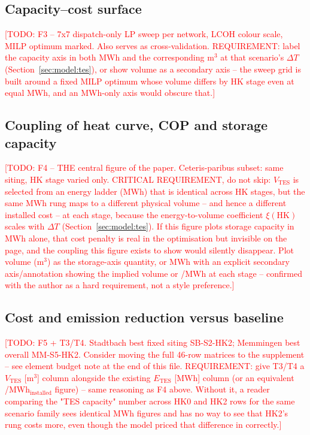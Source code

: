 \documentclass[review,3p]{elsarticle}
\newcommand{\todo}[1]{\textcolor{red}{[TODO: #1]}}
\begin{document}
\subsection{Capacity--cost surface}
\label{sec:results:sweep}
\todo{F3 -- 7x7 dispatch-only LP sweep per network, LCOH colour scale,
MILP optimum marked. Also serves as cross-validation.
REQUIREMENT: label the capacity axis in both MWh and the corresponding
m$^3$ at that scenario's $\Delta T$ (Section~\ref{sec:model:tes}), or
show volume as a secondary axis -- the sweep grid is built around a
fixed MILP optimum whose volume differs by HK stage even at equal MWh,
and an MWh-only axis would obscure that.}

\subsection{Coupling of heat curve, COP and storage capacity}
\label{sec:results:coupling}
\todo{F4 -- THE central figure of the paper. Ceteris-paribus subset:
same siting, HK stage varied only.
CRITICAL REQUIREMENT, do not skip: $V_\mathrm{TES}$ is selected from an
energy ladder (MWh) that is identical across HK stages, but the same
MWh rung maps to a different physical volume -- and hence a different
installed cost -- at each stage, because the energy-to-volume
coefficient $\xi(\mathrm{HK})$ scales with $\Delta T$
(Section~\ref{sec:model:tes}). If this figure plots storage capacity in
MWh alone, that cost penalty is real in the optimisation but invisible
on the page, and the coupling this figure exists to show would silently
disappear. Plot volume (m$^3$) as the storage-axis quantity, or MWh with
an explicit secondary axis/annotation showing the implied volume or
\si{\eur}/MWh at each stage -- confirmed with the author as a hard
requirement, not a style preference.}

\subsection{Cost and emission reduction versus baseline}
\label{sec:results:costs}
\todo{F5 + T3/T4. Stadtbach best fixed siting SB-S2-HK2; Memmingen best
overall MM-S5-HK2. Consider moving the full 46-row matrices to the
supplement -- see element budget note at the end of this file.
REQUIREMENT: give T3/T4 a $V_\mathrm{TES}$ [m$^3$] column alongside the
existing $E_\mathrm{TES}$ [MWh] column (or an equivalent
\si{\eur}/MWh$_\mathrm{installed}$ figure) -- same reasoning as F4 above.
Without it, a reader comparing the "TES capacity" number across HK0 and
HK2 rows for the same scenario family sees identical MWh figures and
has no way to see that HK2's rung costs more, even though the model
priced that difference in correctly.}
\end{document}
